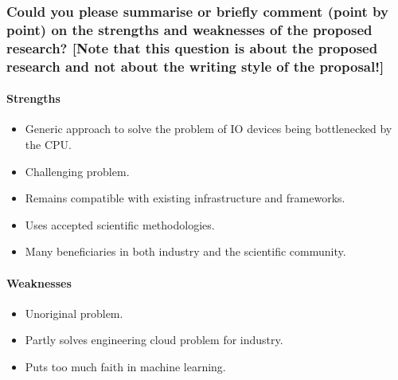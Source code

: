 \subsubsection*{Could you please summarise or briefly comment (point by point) on the strengths and weaknesses of the proposed research? [Note that this question is about the proposed research and not about the writing style of the proposal!]}
\paragraph{Strengths}
\begin{itemize}
    \item Generic approach to solve the problem of IO devices being bottlenecked by the CPU.
    \item Challenging problem.
    \item Remains compatible with existing infrastructure and frameworks.
    \item Uses accepted scientific methodologies.
    \item Many beneficiaries in both industry and the scientific community.
\end{itemize}

\paragraph{Weaknesses}
\begin{itemize}
    \item Unoriginal problem.
    \item Partly solves engineering cloud problem for industry.
    \item Puts too much faith in machine learning.
\end{itemize}
